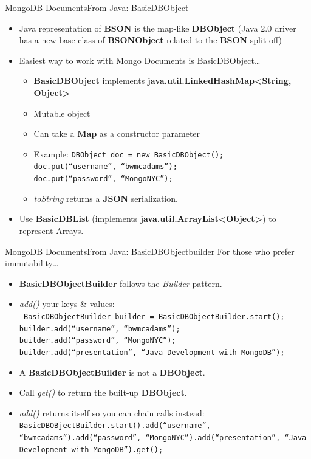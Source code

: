 \documentclass{beamer}
\begin{document}
\begin{frame}{MongoDB Documents}{From Java: BasicDBObject}
    \begin{itemize}
        \item Java representation of {\bf BSON} is the map-like {\bf DBObject} \pause (Java 2.0 driver has a new base class of {\bf BSONObject} related to the {\bf BSON} split-off)
        \item Easiest way to work with Mongo Documents is BasicDBObject\dots
            \begin{itemize}
                \item {\bf BasicDBObject} implements {\bf java.util.LinkedHashMap<String, Object>}
                \item Mutable object
                \item Can take a {\bf Map} as a constructor parameter
                \item Example: 
                    \texttt{\scriptsize DBObject doc = new BasicDBObject();\\
                    doc.put(``username'', ``bwmcadams'');\\
                    doc.put(``password'', ``MongoNYC'');}
                \item {\em toString} returns a {\bf JSON} serialization.
            \end{itemize}
        \item Use {\bf BasicDBList} (implements {\bf java.util.ArrayList<Object>}) to represent Arrays.
    \end{itemize}
\end{frame}

\begin{frame}{MongoDB Documents}{From Java: BasicDBObjectbuilder}
    For those who prefer immutability\dots
    \begin{itemize}
        \item {\bf BasicDBObjectBuilder} follows the {\em Builder} pattern.
        \item {\em add()} your keys \& values:\\
        \texttt{
            \tiny
            BasicDBObjectBuilder builder = BasicDBObjectBuilder.start();\\
            builder.add(``username'', ``bwmcadams'');\\
            builder.add(``password'', ``MongoNYC'');\\
            builder.add(``presentation'', ``Java Development with MongoDB'');
        }
        \item A {\bf BasicDBObjectBuilder} is not a {\bf DBObject}. 
        \item Call {\em get()} to return the built-up {\bf DBObject}.
        \item {\em add()} returns itself so you can chain calls instead: \texttt{\tiny BasicDBOBjectBuilder.start().add(``username'', ``bwmcadams'').add(``password'', ``MongoNYC'').add(``presentation'', ``Java Development with MongoDB'').get();}
    \end{itemize}
\end{frame}
\end{document}
